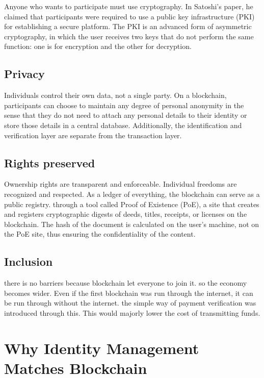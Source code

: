   Anyone who wants to participate must use cryptography. In Satoshi’s paper, he claimed that participants were required to use a public key infrastructure (PKI) for establishing a secure platform. The PKI is an advanced form of asymmetric cryptography, in which the user receives two keys that do not perform the same function: one is for encryption and the other for decryption.

  \subsection{Privacy}

  Individuals control their own data, not a single party. On a blockchain, participants can choose to maintain any degree of personal anonymity in the sense that they do not need to attach any personal details to their identity or store those details in a central database. Additionally, the identification and verification layer are separate from the transaction layer.

  \subsection{Rights preserved}
  Ownership rights are transparent and enforceable. Individual freedoms are recognized and respected. As a ledger of everything, the blockchain can serve as a public registry. through a tool called Proof of Existence (PoE), a site that creates and registers cryptographic digests of deeds, titles, receipts, or licenses on the blockchain. The hash of the document is calculated on the user’s machine, not on the PoE site, thus ensuring the confidentiality of the content.

  \subsection{Inclusion}
  there is no barriers because blockchain let everyone to join it. so the economy becomes wider. Even if the first blockchain was run through the internet, it can be run through without the internet.  the simple way of payment verification was introduced through this. This would majorly lower the cost of transmitting funds.

  \section{Why Identity Management Matches Blockchain}

